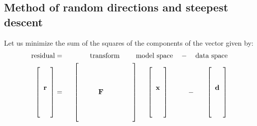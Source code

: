 \subsection{Method of random directions and steepest descent}
 
\par
Let us minimize the sum of the squares of the components
of the  vector given by:
\begin{eqnarray}
{\rm residual}
&=& \quad\quad
{\rm 
\ \ \hbox{transform} \ \ \  \ \quad \hbox{model space} 
\ \ \ -\ \
\ \hbox{data space}
}
        \\                                                                               
\left[
\begin{array}{c}
\, \\
\, \\
\bold r\\
\, \\
\, \\
\,
\end{array}
\right]
       &=&
       \ \ 
\left[
\begin{array}{cccccc}
\, & \,& \,&     \,& \,& \, \\
\, & \,& \,&     \,& \,& \, \\
\, & \,& \,&     \,& \,& \, \\
\, & \,& \bold F \,& \,& \, \\
\, & \,& \,&     \,& \,& \, \\
\, & \,& \,&     \,& \,& \, \\
\, & \,& \,&     \,& \,& \,
\end{array}
  \right]
 \ \ \ \
\left[
\begin{array}{c}
\, \\
\, \\
\bold x\\
\, \\
\, \\
\,
\end{array}
  \right]
  \ \ \ 
\ \ \ \ \ -\ \ \ \ \ 
\left[
\begin{array}{c}
\, \\
\, \\
\bold d\\
\, \\
\, \\
\,
\end{array}
  \right]
\label{eqn:cg1b}
\end{eqnarray}
